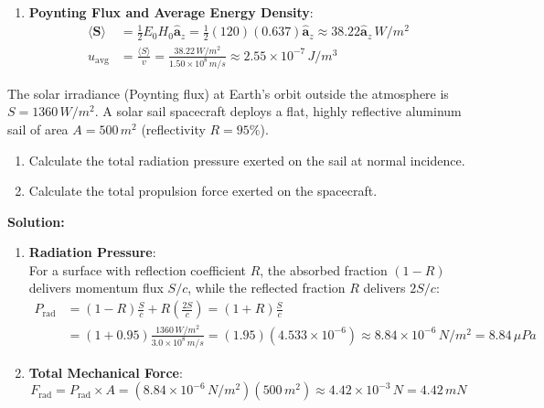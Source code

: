 \begin{example}
\begin{enumerate}
    \item \textbf{Poynting Flux and Average Energy Density}:
    \begin{align*}
        \langle \mathbf{S} \rangle &= \frac{1}{2} E_0 H_0 \hat{\mathbf{a}}_z = \frac{1}{2}(120)(0.637)\hat{\mathbf{a}}_z \approx 38.22 \hat{\mathbf{a}}_z\,\si{W/m^2} \\
        u_{\text{avg}} &= \frac{\langle S \rangle}{v} = \frac{38.22\,\si{W/m^2}}{1.50 \times 10^8\,\si{m/s}} \approx 2.55 \times 10^{-7}\,\si{J/m^3}
    \end{align*}
\end{enumerate}
\end{example}

\begin{example}
The solar irradiance (Poynting flux) at Earth's orbit outside the atmosphere is $S = 1360\,\si{W/m^2}$. A solar sail spacecraft deploys a flat, highly reflective aluminum sail of area $A = 500\,\si{m^2}$ (reflectivity $R = 95\%$).
\begin{enumerate}
    \item Calculate the total radiation pressure exerted on the sail at normal incidence.
    \item Calculate the total propulsion force exerted on the spacecraft.
\end{enumerate}

\textbf{Solution:}
\begin{enumerate}
    \item \textbf{Radiation Pressure}:\\
    For a surface with reflection coefficient $R$, the absorbed fraction $(1-R)$ delivers momentum flux $S/c$, while the reflected fraction $R$ delivers $2S/c$:
    \begin{align*}
        P_{\text{rad}} &= (1-R)\frac{S}{c} + R\left(\frac{2S}{c}\right) = (1+R)\frac{S}{c} \\
        &= (1 + 0.95) \frac{1360\,\si{W/m^2}}{3.0 \times 10^8\,\si{m/s}} = (1.95)(4.533 \times 10^{-6}) \approx 8.84 \times 10^{-6}\,\si{N/m^2} = 8.84\,\si{\mu Pa}
    \end{align*}
    
    \item \textbf{Total Mechanical Force}:
    \begin{equation*}
        F_{\text{rad}} = P_{\text{rad}} \times A = (8.84 \times 10^{-6}\,\si{N/m^2})(500\,\si{m^2}) \approx 4.42 \times 10^{-3}\,\si{N} = 4.42\,\si{mN}
    \end{equation*}
\end{enumerate}
\end{example}

